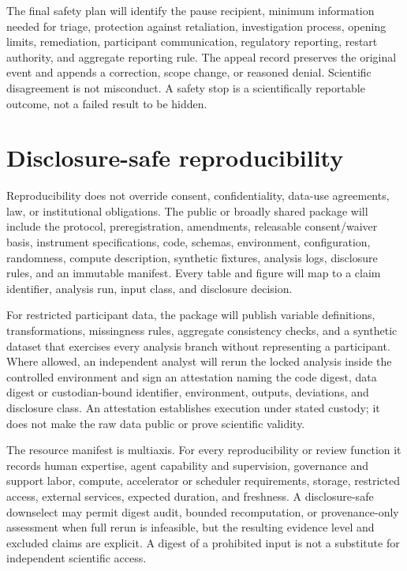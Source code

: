 \documentclass[11pt]{article}
\begin{document}
The final safety plan will identify the pause recipient, minimum information needed
for triage, protection against retaliation, investigation process, opening limits,
remediation, participant communication, regulatory reporting, restart authority,
and aggregate reporting rule. The appeal record preserves the original event and
appends a correction, scope change, or reasoned denial. Scientific disagreement is
not misconduct. A safety stop is a scientifically reportable outcome, not a failed
result to be hidden.

\section{Disclosure-safe reproducibility}

Reproducibility does not override consent, confidentiality, data-use agreements,
law, or institutional obligations. The public or broadly shared package will
include the protocol, preregistration, amendments, releasable consent/waiver basis,
instrument specifications, code, schemas, environment, configuration, randomness,
compute description, synthetic fixtures, analysis logs, disclosure rules, and an
immutable manifest. Every table and figure will map to a claim identifier, analysis
run, input class, and disclosure decision.

For restricted participant data, the package will publish variable definitions,
transformations, missingness rules, aggregate consistency checks, and a synthetic
dataset that exercises every analysis branch without representing a participant.
Where allowed, an independent analyst will rerun the locked analysis inside the
controlled environment and sign an attestation naming the code digest, data digest
or custodian-bound identifier, environment, outputs, deviations, and disclosure
class. An attestation establishes execution under stated custody; it does not make
the raw data public or prove scientific validity.

The resource manifest is multiaxis. For every reproducibility or review function it
records human expertise, agent capability and supervision, governance and support
labor, compute, accelerator or scheduler requirements, storage, restricted access,
external services, expected duration, and freshness. A disclosure-safe downselect
may permit digest audit, bounded recomputation, or provenance-only assessment when
full rerun is infeasible, but the resulting evidence level and excluded claims are
explicit. A digest of a prohibited input is not a substitute for independent
scientific access.
\end{document}

